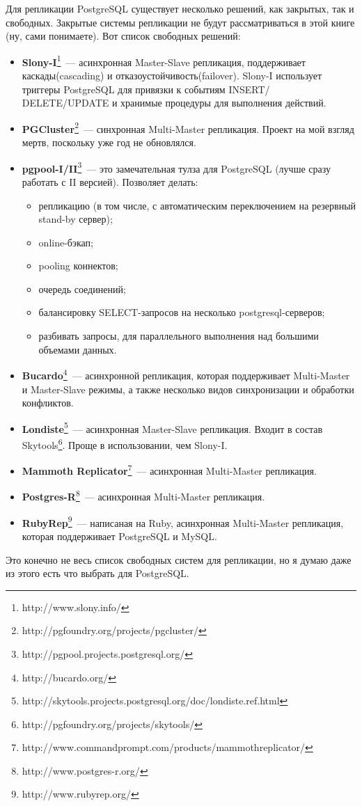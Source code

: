 Для репликации PostgreSQL существует несколько решений, как закрытых, так и свободных. 
Закрытые системы репликации не будут рассматриваться в этой книге (ну, сами понимаете). Вот список свободных решений:
\begin{itemize}
\item \textbf{Slony-I}\footnote{http://www.slony.info/}~--- асинхронная Master-Slave репликация, 
поддерживает каскады(cascading) и отказоустойчивость(failover). 
Slony-I использует триггеры PostgreSQL для привязки к событиям INSERT/ DELETE/UPDATE и хранимые 
процедуры для выполнения действий. 

\item \textbf{PGCluster}\footnote{http://pgfoundry.org/projects/pgcluster/}~--- синхронная Multi-Master репликация. 
Проект на мой взгляд мертв, поскольку уже год не обновлялся.

\item \textbf{pgpool-I/II}\footnote{http://pgpool.projects.postgresql.org/}~--- это замечательная тулза для 
PostgreSQL (лучше сразу работать с II версией). Позволяет делать:
\begin{itemize}
\item репликацию (в том числе, с автоматическим переключением на резервный stand-by сервер);
\item online-бэкап;
\item pooling коннектов;
\item очередь соединений;
\item балансировку SELECT-запросов на несколько postgresql-серверов;
\item разбивать запросы, для параллельного выполнения над большими объемами данных.
\end{itemize}

\item \textbf{Bucardo}\footnote{http://bucardo.org/}~--- асинхронной репликация, которая поддерживает Multi-Master и Master-Slave режимы, 
а также несколько видов синхронизации и обработки конфликтов. 

\item \textbf{Londiste}\footnote{http://skytools.projects.postgresql.org/doc/londiste.ref.html}~--- асинхронная Master-Slave 
репликация. Входит в состав Skytools\footnote{http://pgfoundry.org/projects/skytools/}. Проще в использовании, чем Slony-I.

\item \textbf{Mammoth Replicator}\footnote{http://www.commandprompt.com/products/mammothreplicator/}~--- асинхронная 
Multi-Master репликация. 

\item \textbf{Postgres-R}\footnote{http://www.postgres-r.org/}~--- асинхронная Multi-Master репликация.

\item \textbf{RubyRep}\footnote{http://www.rubyrep.org/}~--- написаная на Ruby, асинхронная Multi-Master 
репликация, которая поддерживает PostgreSQL и MySQL.
\end{itemize}

Это конечно не весь список свободных систем для репликации, но я думаю даже из этого есть что выбрать для PostgreSQL.